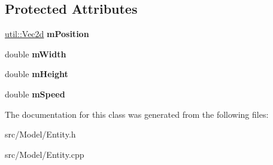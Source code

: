 \subsection*{Protected Attributes}
\begin{DoxyCompactItemize}
\item 
\mbox{\label{classmodel_1_1_entity_aae28354327688b126738a43ae79816ae}} 
\mbox{\hyperlink{classutil_1_1_vec2}{util\+::\+Vec2d}} {\bfseries m\+Position}
\item 
\mbox{\label{classmodel_1_1_entity_a4995a9055051348649e8abc7a4aa5d47}} 
double {\bfseries m\+Width}
\item 
\mbox{\label{classmodel_1_1_entity_a03f04fcf195ba27224b6d9deb4ee45ee}} 
double {\bfseries m\+Height}
\item 
\mbox{\label{classmodel_1_1_entity_af1ac221ec2a1ea5dfdf412902ae7732d}} 
double {\bfseries m\+Speed}
\end{DoxyCompactItemize}


The documentation for this class was generated from the following files\+:\begin{DoxyCompactItemize}
\item 
src/\+Model/Entity.\+h\item 
src/\+Model/Entity.\+cpp\end{DoxyCompactItemize}
